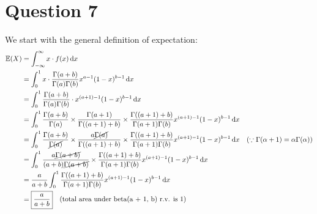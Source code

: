 \documentclass[12pt]{article}
\begin{document}
\newpage

\section*{Question 7}

We start with the general definition of expectation: \begin{align*}
    \mathbb{E}(X) &= \int_{-\infty}^{\infty} x \cdot f(x) \, \mathrm{d}x \\ 
    &= \int_{0}^{1} x \cdot \frac{\Gamma(a+b)}{\Gamma(a) \Gamma(b)}x^{a-1}(1-x)^{b-1} \, \mathrm{d}x \\ 
    &= \int_{0}^{1} \frac{\Gamma(a+b)}{\Gamma(a) \Gamma(b)}\cdot x^{(a+1)-1}(1-x)^{b-1} \, \mathrm{d}x \\ 
    &= \int_{0}^{1} \frac{\Gamma(a+b)}{\Gamma(a)} \times \frac{\Gamma(a+1)}{\Gamma((a+1)+b)}\times \frac{\Gamma((a+1)+b)}{\Gamma(a+1)\Gamma(b)} x^{(a+1)-1}(1-x)^{b-1} \, \mathrm{d}x \\ 
    &= \int_{0}^{1} \frac{\Gamma(a+b)}{\cancel{\Gamma(a)}} \times \frac{a\cancel{\Gamma(a)}}{\Gamma((a+1)+b)}\times \frac{\Gamma((a+1)+b)}{\Gamma(a+1)\Gamma(b)} x^{(a+1)-1}(1-x)^{b-1} \, \mathrm{d}x \quad (\because \Gamma(\alpha+1) = \alpha\Gamma(\alpha)) \\ 
    &= \int_{0}^{1} \frac{a\cancel{\Gamma(a+b)}}{(a+b)\cancel{\Gamma(a+b)}} \times \frac{\Gamma((a+1)+b)}{\Gamma(a+1)\Gamma(b)} x^{(a+1)-1}(1-x)^{b-1} \, \mathrm{d}x \\ 
    &= \frac{a}{a+b} \int_{0}^{1} \frac{\Gamma((a+1)+b)}{\Gamma(a+1)\Gamma(b)} x^{(a+1)-1}(1-x)^{b-1} \, \mathrm{d}x \\ 
    &= \boxed{\frac{a}{a+b}} \quad (\text{total area under beta(a + 1, b) r.v. is 1})
\end{align*}
\end{document}
